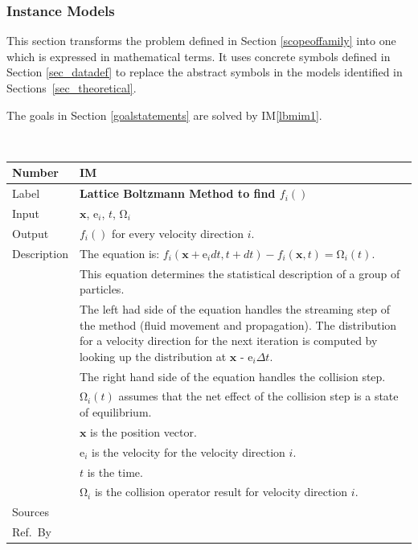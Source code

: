 \documentclass[12pt]{article}
\newcommand{\colAwidth}{0.13\textwidth}
\newcommand{\colBwidth}{0.82\textwidth}
\newcounter{instnum} %
\begin{document}
\subsubsection{Instance Models} \label{sec_instance}    

This section transforms the problem defined in Section \ref{scopeoffamily} into 
one which is expressed in mathematical terms. It uses concrete symbols defined 
in Section \ref{sec_datadef} to replace the abstract symbols in the models 
identified in Sections~\ref{sec_theoretical}.

The goals in Section \ref{goalstatements} are solved by IM\ref{lbmim1}.

~\newline


\noindent
\begin{minipage}{\textwidth}
	\renewcommand*{\arraystretch}{1.5}
	\begin{tabular}{| p{\colAwidth} | p{\colBwidth}|}
		\hline
		\rowcolor[gray]{0.9}
		Number& IM{instnum}\theinstnum \label{lbmim1}\\
		\hline
		Label& \bf Lattice Boltzmann Method to find $f_i()$\\
		\hline		
		Input&$\mathrm{\textbf{x}}$, $\mathrm{e}_i$, $t$, $\mathrm{\Omega}_i$\\
		\hline
		Output& $f_i()$ for every velocity direction $i$.\\
		\hline
		Description&
		The equation is: $f_i(\mathrm{\textbf{x}} +\mathrm{e}_i dt, t + dt) - f_i(\mathrm{\textbf{x}},t) = \mathrm{\Omega}_i (t)$.\\
		&This equation determines the statistical description of a group of particles.\\
		&The left had side of the equation handles the streaming step of the method (fluid movement and propagation). The distribution for a velocity direction for the next iteration is computed by looking up the distribution at $\mathrm{\textbf{x}}$ - $\mathrm{e}_i \Delta t$.\\
		&The right hand side of the equation handles the collision step.\\ &$\mathrm{\Omega}_i (t)$ assumes that the net effect of the collision step is a state of equilibrium.\\
		&$\mathrm{\textbf{x}}$ is the position vector.\\ 
		&$\mathrm{e}_i$ is the velocity for the velocity direction $i$.\\ 
		&$t$ is the time.\\ 
		&$\mathrm{\Omega}_i$ is the collision operator result for velocity direction $i$.\\
		\hline
		Sources& \citet{gibiansky} \\
		\hline
		Ref.\ By & \\
		\hline
	\end{tabular}
\end{minipage}\\
\end{document}
